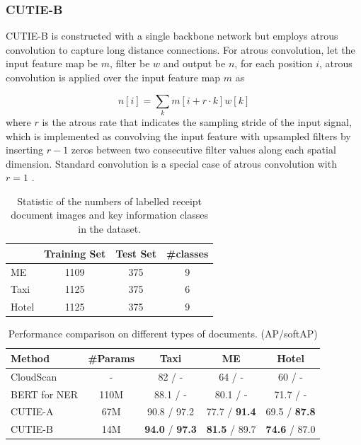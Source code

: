 \documentclass[10pt,twocolumn,letterpaper]{article}
\begin{document}
\subsubsection{CUTIE-B}
CUTIE-B is constructed with a single backbone network but employs atrous convolution to capture long distance connections. For atrous convolution, let the input feature map be $m$, filter be $w$ and output be $n$, for each position $i$, atrous convolution is applied over the input feature map $m$ as 

\begin{equation}
n[i] = \sum_k m[i+r\cdot k]w[k]
\end{equation}
where $r$ is the atrous rate that indicates the sampling stride of the input signal, which is implemented as convolving the input feature with upsampled filters by inserting $r-1$ zeros between two consecutive filter values along each spatial dimension. Standard convolution is a special case of atrous convolution with $r=1$ \cite{deeplabv1}.

\begin{table}
	\caption{Statistic of the numbers of labelled receipt document images and key information classes in the dataset.}
\begin{center}
\begin{tabular}{l | c | c | c}
	 & Training Set & Test Set & \#classes \\
	\hline
	ME & 1109 & 375 & 9 \\
	Taxi & 1125 & 375 & 6 \\
	Hotel & 1125 & 375 & 9 \\
\end{tabular}
\end{center}
	\label{tab:dataset}
\end{table}

\begin{table}
	\caption{Performance comparison on different types of documents. (AP/softAP)}
\begin{center}
\begin{tabular}{l | c | c | c | c}
	Method & \#Params & Taxi & ME & Hotel \\
	\hline
	CloudScan\cite{cloudscan} & - & 82 / - & 64 / - & 60 / - \\
	BERT for NER\cite{bert} & 110M & 88.1 / - & 80.1 / - & 71.7 / - \\
	CUTIE-A & 67M & 90.8 / 97.2 & 77.7 / \textbf{91.4} & 69.5 / \textbf{87.8} \\
	CUTIE-B & 14M & \textbf{94.0} / \textbf{97.3} & \textbf{81.5} / 89.7 & \textbf{74.6} / 87.0 \\
\end{tabular}
\end{center}
	\label{tab:comparison}
\end{table}
\end{document}
